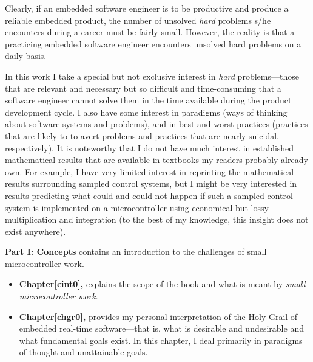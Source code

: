 \documentclass[letterpaper,10pt,titlepage]{custbook}
\begin{document}
Clearly, if an embedded software engineer is to be productive and
produce a reliable embedded product, the number of unsolved
\emph{hard} problems s/he encounters during a career must
be fairly small.  However, the reality is that a practicing
embedded software engineer encounters unsolved hard problems
on a daily basis.

In this work I take a special but not exclusive interest in
\emph{hard} problems---those that are relevant and necessary
but
so difficult and time-consuming that a software engineer cannot
solve them in the time available during the product development
cycle.  I also have some interest in paradigms (ways of
thinking about software systems and problems), and in
best and worst practices (practices that are likely to to
avert problems and practices that are nearly suicidal,
respectively).  It is noteworthy that I do not
have much interest in established
mathematical results that are available in
textbooks my readers probably already own.
For example, I have very limited interest in
reprinting the mathematical results surrounding
sampled control systems, but
I might be very interested in results predicting what
could and could not happen if such a
sampled control system is implemented on
a microcontroller using economical but lossy
multiplication and integration (to the best of my
knowledge, this insight does not exist anywhere).

\textbf{Part I:  Concepts}
contains an introduction to the challenges of small microcontroller work.
\begin{itemize}
\item \textbf{Chapter\;\ref{cint0}, \cintzerotitle{}} explains the scope of the book 
      and what is meant by \emph{small microcontroller work}.
\item \textbf{Chapter\;\ref{chgr0}, \chgrzerotitle{}} provides my personal 
      interpretation of the
      Holy Grail of embedded real-time software---that is, what is
      desirable and undesirable and what fundamental goals
      exist.  In this chapter, I deal primarily in paradigms of
      thought and
      unattainable goals.
\end{itemize}
\end{document}
